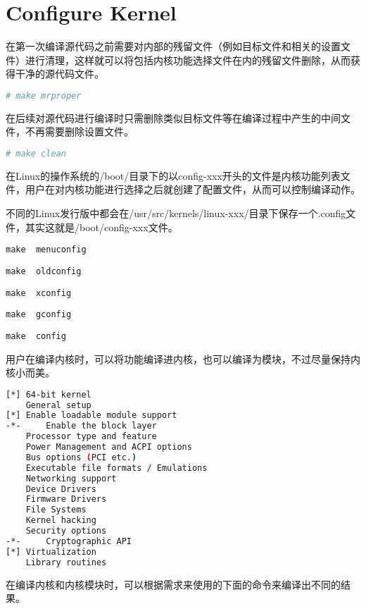 \section{Configure Kernel}

在第一次编译源代码之前需要对内部的残留文件（例如目标文件和相关的设置文件）进行清理，这样就可以将包括内核功能选择文件在内的残留文件删除，从而获得干净的源代码文件。

\begin{lstlisting}[language=bash]
# make mrproper
\end{lstlisting}

在后续对源代码进行编译时只需删除类似目标文件等在编译过程中产生的中间文件，不再需要删除设置文件。

\begin{lstlisting}[language=bash]
# make clean
\end{lstlisting}

在Linux的操作系统的/boot/目录下的以config-xxx开头的文件是内核功能列表文件，用户在对内核功能进行选择之后就创建了配置文件，从而可以控制编译动作。


不同的Linux发行版中都会在/usr/src/kernels/linux-xxx/目录下保存一个.config文件，其实这就是/boot/config-xxx文件。


\begin{compactitem}
\item \texttt{make ~menuconfig}
\item \texttt{make ~oldconfig}
\item \texttt{make ~xconfig}
\item \texttt{make ~gconfig}
\item \texttt{make ~config}
\end{compactitem}



用户在编译内核时，可以将功能编译进内核，也可以编译为模块，不过尽量保持内核小而美。

\begin{lstlisting}[language=bash]
[*]	64-bit kernel
	General setup
[*]	Enable loadable module support
-*- 	Enable the block layer
	Processor type and feature
	Power Management and ACPI options
	Bus options (PCI etc.)
	Executable file formats / Emulations
	Networking support
	Device Drivers
	Firmware Drivers
	File Systems
	Kernel hacking
	Security options
-*- 	Cryptographic API
[*]	Virtualization 
	Library routines
\end{lstlisting}

在编译内核和内核模块时，可以根据需求来使用的下面的命令来编译出不同的结果。

